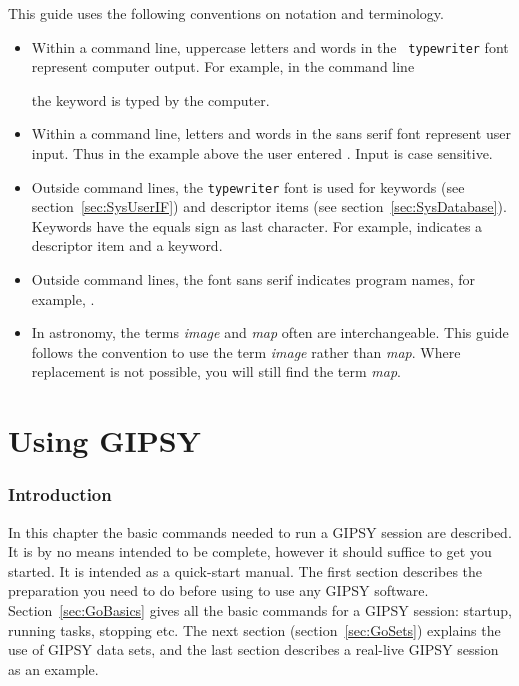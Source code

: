 This guide uses the following conventions on notation and terminology.

\begin{itemize}

\item Within a command line, uppercase letters and words in the {\tt
typewriter} font represent computer output.  For example, in the command
line


the keyword  is typed by the computer.

\item Within a command line, letters and words in the {\sf sans serif}
font represent user input.  Thus in the example above the user entered
.  Input is case sensitive. 

\item Outside command lines, the {\tt typewriter} font is used for
keywords (see section~\ref{sec:SysUserIF}) and descriptor items (see
section~\ref{sec:SysDatabase}).  Keywords have the equals sign as last 
character.  For example,  indicates a descriptor
item and  a keyword. 

\item Outside command lines, the font {\sf sans serif} indicates program
names, for example, . 
  
\item In astronomy, the terms {\em image} and {\em map} often are
interchangeable.  This guide follows the convention to use the term {\em
image} rather than {\em map}.  Where replacement is not possible, you
will still find the term {\em map}. 

\end{itemize}


\part{Using GIPSY\label{part:GIPSYUse}}


\label{chapter:GoGoGo}

\section{Introduction}

  In this chapter the basic commands needed to run a GIPSY session are
described.  It is by no means intended to be complete, however it should
suffice to get you started.  It is intended as a quick-start manual. 
The first section describes the preparation you need to do before using
to use any GIPSY software. Section~\ref{sec:GoBasics} gives all the
basic commands for a GIPSY session: startup, running tasks, stopping
etc. The next section (section~\ref{sec:GoSets}) explains the use of
GIPSY data sets, and the last section describes a real-live
GIPSY session as an example.

